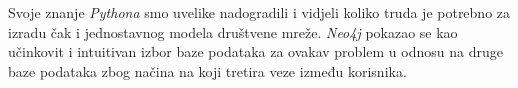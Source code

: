 \documentclass[titlepage, 12pt]{scrartcl}
\begin{document}
	Svoje znanje \emph{Pythona} smo uvelike nadogradili i vidjeli koliko truda je potrebno za izradu čak i jednostavnog modela društvene mreže. \emph{Neo4j} pokazao se kao učinkovit i intuitivan izbor baze podataka za ovakav problem u odnosu na druge baze podataka zbog načina na koji tretira veze između korisnika. 
	
	
	\newpage
	\nocite{*}
    \printbibliography
\end{document}
